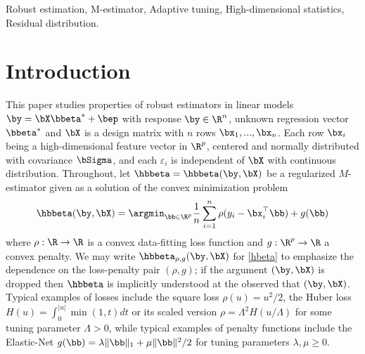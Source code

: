\documentclass{colt2022} %
\numberwithin{equation}{section}
\begin{document}
\begin{keywords}
    Robust estimation,
    M-estimator,
    Adaptive tuning,
    High-dimensional statistics,
    Residual distribution.
\end{keywords}

\section{Introduction}

This paper studies properties
of robust estimators in linear models
$
\by = \bX \bbeta^* + \bep
$
with response $\by\in\R^n$, unknown regression vector $\bbeta^*$ and
$\bX$ is a design matrix with $n$ rows $\bx_1,...,\bx_n$.
Each row $\bx_i$ being a high-dimensional feature vector in $\R^p$, centered and normally distributed 
with covariance $\bSigma$, and each $\varepsilon_i$ is independent of $\bX$ with continuous distribution.
Throughout, let $\hbbeta=\hbbeta(\by,\bX)$ be a regularized $M$-estimator given 
as a solution of the convex minimization problem
\begin{equation}
    \hbbeta(\by,\bX) = \argmin_{\bb \in \R^p}
    \frac 1 n\sum_{i=1}^n\rho(y_i - \bx_i^\top \bb) + g(\bb)
    \label{hbeta}
\end{equation}
where $\rho:\R\to\R$ is a convex data-fitting loss function
and $g:\R^p\to\R$ a convex penalty. 
We may write $\hbbeta_{\rho,g}(\by,\bX)$ for \eqref{hbeta}
to emphasize the dependence on the loss-penalty pair $(\rho, g)$;
if the argument $(\by,\bX)$ is dropped then $\hbbeta$ is implicitly understood
at the observed that $(\by,\bX)$.
Typical examples of losses include the square loss $\rho(u)=u^2/2$,
the Huber loss $H(u)=\int_0^{|u|}\min(1,t)dt$
or its scaled version $\rho = \Lambda^{2} H( u/ \Lambda)$ 
for some tuning parameter $\Lambda>0$,
while typical examples of penalty functions include
the Elastic-Net $g(\bb) = \lambda \|\bb\|_1 + \mu\|\bb\|^2/2$
for tuning parameters $\lambda,\mu \ge 0$.
\end{document}
